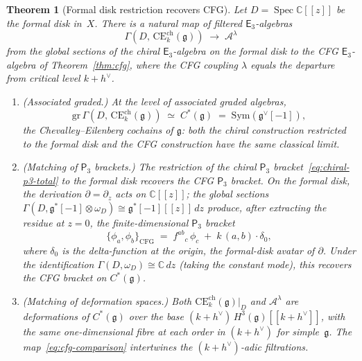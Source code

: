\documentclass[11pt,reqno]{amsart}
\newtheorem{theorem}{Theorem}[section]
\theoremstyle{definition}
\theoremstyle{remark}
\newcommand{\cA}{\mathcal{A}}
\newcommand{\CE}{\mathrm{CE}}
\newcommand{\Ethree}{\mathsf{E}_{3}}
\newcommand{\Pthree}{\mathsf{P}_{3}}
\newcommand{\Sym}{\mathrm{Sym}}
\DeclareMathOperator{\Spec}{Spec}
\newcommand{\fg}{\mathfrak{g}}
\newcommand{\CC}{\mathbb{C}}
\numberwithin{equation}{section}
\begin{document}
\begin{theorem}[Formal disk restriction recovers CFG]
\label{thm:chiral-e3-cfg}
Let $D = \Spec \CC[[z]]$ be the formal disk in~$X$.
There is a natural map of filtered $\Ethree$-algebras
\begin{equation}\label{eq:cfg-comparison}
  \Gamma(D,\, \CE^{\mathrm{ch}}_k(\fg))
  \;\longrightarrow\;
  \cA^\lambda
\end{equation}
from the global sections of the chiral $\Ethree$-algebra
on the formal disk to the CFG $\Ethree$-algebra of
Theorem~\textup{\ref{thm:cfg}}, where the CFG coupling
$\lambda$ equals the departure from critical level
$k + h^\vee$.
\begin{enumerate}[label=\textup{(\roman*)}]
\item \textup{(Associated graded.)}
  At the level of associated graded algebras,
  \begin{equation}\label{eq:cfg-assoc-graded}
    \mathrm{gr}\,\Gamma(D,\, \CE^{\mathrm{ch}}_k(\fg))
    \;\simeq\;
    C^*(\fg)
    \;=\;
    \Sym(\fg^\vee[-1]),
  \end{equation}
  the Chevalley--Eilenberg cochains of $\fg$: both the
  chiral construction restricted to the formal disk and the
  CFG construction have the same classical limit.
\item \textup{(Matching of $\Pthree$ brackets.)}
  The restriction of the chiral $\Pthree$
  bracket~\eqref{eq:chiral-p3-total} to the formal disk
  recovers the CFG $\Pthree$ bracket.
  On the formal disk, the derivation $\partial = \partial_z$
  acts on $\CC[[z]]$; the global sections
  $\Gamma(D, \fg^*[-1] \otimes \omega_D)
  \cong \fg^*[-1][[z]]\,dz$ produce, after extracting the
  residue at $z = 0$, the finite-dimensional $\Pthree$
  bracket
  \[
    \{\phi_a, \phi_b\}_{\mathrm{CFG}}
    \;=\;
    f^{ab}{}_c\,\phi_c
    \;+\;
    k\,(a,b) \cdot \delta_0,
  \]
  where $\delta_0$ is the delta-function at the origin,
  the formal-disk avatar of $\partial$. Under the
  identification $\Gamma(D, \omega_D) \cong \CC\,dz$
  \textup{(}taking the constant mode\textup{)}, this
  recovers the CFG bracket on $C^*(\fg)$.
\item \textup{(Matching of deformation spaces.)}
  Both $\CE^{\mathrm{ch}}_k(\fg)\big|_D$ and
  $\cA^\lambda$ are deformations of $C^*(\fg)$ over the
  base $(k+h^\vee)\,H^3(\fg)[[k+h^\vee]]$, with the same
  one-dimensional fibre at each order in $(k+h^\vee)$ for
  simple~$\fg$.
  The map~\eqref{eq:cfg-comparison} intertwines
  the $(k+h^\vee)$-adic filtrations.
\end{enumerate}
\end{theorem}
\end{document}

